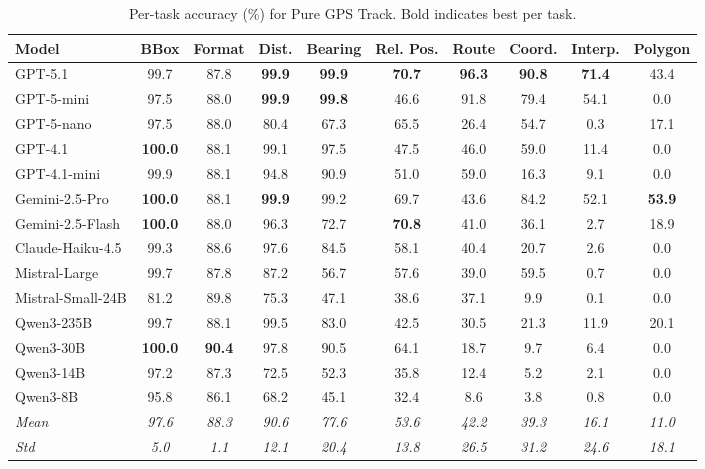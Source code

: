 \begin{table}[htbp]
\centering
\caption{Per-task accuracy (\%) for Pure GPS Track. Bold indicates best per task.}
\label{tab:per_task_pure_gps}
\small
\begin{tabular}{lccccccccc}
\toprule
\textbf{Model} & \textbf{BBox} & \textbf{Format} & \textbf{Dist.} & \textbf{Bearing} & \textbf{Rel. Pos.} & \textbf{Route} & \textbf{Coord.} & \textbf{Interp.} & \textbf{Polygon} \\
\midrule
GPT-5.1 & 99.7 & 87.8 & \textbf{99.9} & \textbf{99.9} & \textbf{70.7} & \textbf{96.3} & \textbf{90.8} & \textbf{71.4} & 43.4 \\
GPT-5-mini & 97.5 & 88.0 & \textbf{99.9} & \textbf{99.8} & 46.6 & 91.8 & 79.4 & 54.1 & 0.0 \\
GPT-5-nano & 97.5 & 88.0 & 80.4 & 67.3 & 65.5 & 26.4 & 54.7 & 0.3 & 17.1 \\
GPT-4.1 & \textbf{100.0} & 88.1 & 99.1 & 97.5 & 47.5 & 46.0 & 59.0 & 11.4 & 0.0 \\
GPT-4.1-mini & 99.9 & 88.1 & 94.8 & 90.9 & 51.0 & 59.0 & 16.3 & 9.1 & 0.0 \\
\midrule
Gemini-2.5-Pro & \textbf{100.0} & 88.1 & \textbf{99.9} & 99.2 & 69.7 & 43.6 & 84.2 & 52.1 & \textbf{53.9} \\
Gemini-2.5-Flash & \textbf{100.0} & 88.0 & 96.3 & 72.7 & \textbf{70.8} & 41.0 & 36.1 & 2.7 & 18.9 \\
\midrule
Claude-Haiku-4.5 & 99.3 & 88.6 & 97.6 & 84.5 & 58.1 & 40.4 & 20.7 & 2.6 & 0.0 \\
\midrule
Mistral-Large & 99.7 & 87.8 & 87.2 & 56.7 & 57.6 & 39.0 & 59.5 & 0.7 & 0.0 \\
Mistral-Small-24B & 81.2 & 89.8 & 75.3 & 47.1 & 38.6 & 37.1 & 9.9 & 0.1 & 0.0 \\
\midrule
Qwen3-235B & 99.7 & 88.1 & 99.5 & 83.0 & 42.5 & 30.5 & 21.3 & 11.9 & 20.1 \\
Qwen3-30B & \textbf{100.0} & \textbf{90.4} & 97.8 & 90.5 & 64.1 & 18.7 & 9.7 & 6.4 & 0.0 \\
Qwen3-14B & 97.2 & 87.3 & 72.5 & 52.3 & 35.8 & 12.4 & 5.2 & 2.1 & 0.0 \\
Qwen3-8B & 95.8 & 86.1 & 68.2 & 45.1 & 32.4 & 8.6 & 3.8 & 0.8 & 0.0 \\
\midrule
\textit{Mean} & \textit{97.6} & \textit{88.3} & \textit{90.6} & \textit{77.6} & \textit{53.6} & \textit{42.2} & \textit{39.3} & \textit{16.1} & \textit{11.0} \\
\textit{Std} & \textit{5.0} & \textit{1.1} & \textit{12.1} & \textit{20.4} & \textit{13.8} & \textit{26.5} & \textit{31.2} & \textit{24.6} & \textit{18.1} \\
\bottomrule
\end{tabular}
\end{table}


